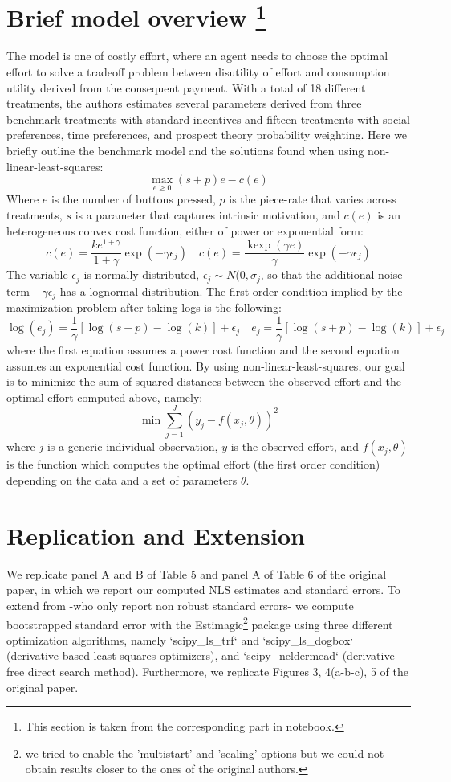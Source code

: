 \documentclass[11pt, a4paper, leqno]{article}
\begin{document}
\section{Brief model overview \footnote{This section is taken from the corresponding part in \cite{PozziNunnari} notebook.}}
\label{sec:model}
The model is one of costly effort, where an agent needs to choose the optimal effort to solve a tradeoff problem between disutility of effort and consumption utility derived from the consequent payment. With a total of 18 different treatments, the authors estimates several parameters derived from three benchmark treatments with standard incentives and fifteen treatments with social preferences, time preferences, and prospect theory probability weighting. Here we briefly outline the benchmark model and the solutions found when using non-linear-least-squares:
$$
\max _{e \geq 0}(s+p) e-c(e)
$$
Where $e$ is the number of buttons pressed, $p$ is the piece-rate that varies across treatments, $s$ is a parameter that captures intrinsic motivation, and $c(e)$ is an heterogeneous convex cost function, either of power or exponential form:
$$
c(e)=\frac{k e^{1+\gamma}}{1+\gamma} \exp \left(-\gamma \epsilon_{j}\right) \quad c(e)=\frac{\operatorname{kexp}(\gamma e)}{\gamma} \exp \left(-\gamma \epsilon_{j}\right)
$$
The variable $\epsilon_{j}$ is normally distributed, $\epsilon_{j}\sim N(0,\sigma_{j}$, so that the additional noise term $-\gamma \epsilon_{j}$ has a lognormal distribution. The first order condition implied by the maximization problem after taking logs is the following:
$$
\log \left(e_{j}\right)=\frac{1}{\gamma}[\log (s+p)-\log (k)]+\epsilon_{j} \quad e_{j}=\frac{1}{\gamma}[\log (s+p)-\log (k)]+\epsilon_{j}
$$
where the first equation assumes a power cost function and the second equation assumes an exponential cost function. By using non-linear-least-squares, our goal is to minimize the sum of squared distances between the observed effort and the optimal effort computed above, namely:
$$
\min \sum_{j=1}^{J}\left(y_{j}-f\left(x_{j}, \theta\right)\right)^{2}
$$
where $j$ is a generic individual observation, $y$ is the observed effort, and $f(x_{j}, \theta)$ is the function which computes the optimal effort (the first order condition) depending on the data and a set of parameters $\theta$.

\section{Replication and Extension}
\label{sec:repl}
We replicate panel A and B of Table 5 and panel A of Table 6 of the original paper, in which we report our computed NLS estimates and standard errors. To extend from \citet{PozziNunnari} -who only report non robust standard errors- we compute bootstrapped standard error with the Estimagic\footnote{we tried to enable the 'multistart' and 'scaling' options but we could not obtain results closer to the ones of the original authors.} package using three different optimization algorithms, namely `scipy\_ls\_trf` and `scipy\_ls\_dogbox` (derivative-based least squares optimizers), and `scipy\_neldermead` (derivative-free direct search method). Furthermore, we replicate Figures 3, 4(a-b-c), 5 of the original paper.
\end{document}
